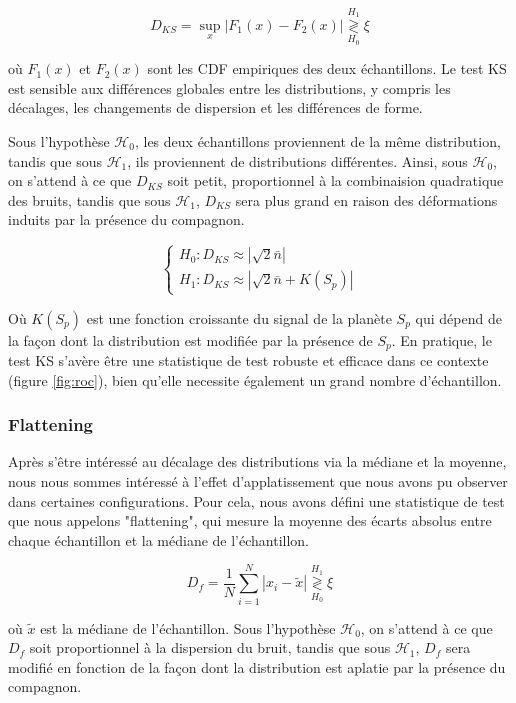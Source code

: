 \documentclass{article}
\begin{document}
$$
D_{KS} = \sup_x |F_1(x) - F_2(x)| \stackrel{H_1}{\underset{H_0}{\gtrless}} \xi
$$

où $F_1(x)$ et $F_2(x)$ sont les CDF empiriques des deux échantillons. Le test KS est sensible aux différences globales entre les distributions, y compris les décalages, les changements de dispersion et les différences de forme.

Sous l'hypothèse $\mathcal{H}_0$, les deux échantillons proviennent de la même distribution, tandis que sous $\mathcal{H}_1$, ils proviennent de distributions différentes. Ainsi, sous $\mathcal{H}_0$, on s'attend à ce que $D_{KS}$ soit petit, proportionnel à la combinaision quadratique des bruits, tandis que sous $\mathcal{H}_1$, $D_{KS}$ sera plus grand en raison des déformations induits par la présence du compagnon.

$$
\begin{cases}
H_0 : D_{KS} \approx |\sqrt{2}\bar{n}|\\
H_1 : D_{KS} \approx |\sqrt{2}\bar{n} + K(S_p)|
\end{cases}
$$

Où $K(S_p)$ est une fonction croissante du signal de la planète $S_p$ qui dépend de la façon dont la distribution est modifiée par la présence de $S_p$. En pratique, le test KS s'avère être une statistique de test robuste et efficace dans ce contexte (figure \ref{fig:roc}), bien qu'elle necessite également un grand nombre d'échantillon.



\subsubsection{Flattening}

Après s'être intéressé au décalage des distributions via la médiane et la moyenne, nous nous sommes intéressé à l'effet d'applatissement que nous avons pu observer dans certaines configurations. Pour cela, nous avons défini une statistique de test que nous appelons "flattening", qui mesure la moyenne des écarts absolus entre chaque échantillon et la médiane de l'échantillon.

$$
D_f = \frac 1 N \sum_{i=1}^N |x_i - \tilde{x}| \stackrel{H_1}{\underset{H_0}{\gtrless}} \xi
$$

où $\tilde{x}$ est la médiane de l'échantillon. Sous l'hypothèse $\mathcal{H}_0$, on s'attend à ce que $D_f$ soit proportionnel à la dispersion du bruit, tandis que sous $\mathcal{H}_1$, $D_f$ sera modifié en fonction de la façon dont la distribution est aplatie par la présence du compagnon.
\end{document}
